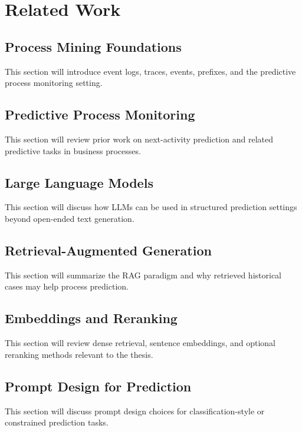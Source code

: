 \chapter{Related Work}

\section{Process Mining Foundations}
This section will introduce event logs, traces, events, prefixes, and the predictive process monitoring setting.

\section{Predictive Process Monitoring}
This section will review prior work on next-activity prediction and related predictive tasks in business processes.

\section{Large Language Models}
This section will discuss how LLMs can be used in structured prediction settings beyond open-ended text generation.

\section{Retrieval-Augmented Generation}
This section will summarize the RAG paradigm and why retrieved historical cases may help process prediction.

\section{Embeddings and Reranking}
This section will review dense retrieval, sentence embeddings, and optional reranking methods relevant to the thesis.

\section{Prompt Design for Prediction}
This section will discuss prompt design choices for classification-style or constrained prediction tasks.

\blankpage

